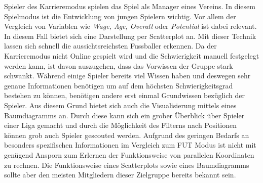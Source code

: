 \documentclass[usegeometry=true]{scrartcl}
\begin{document}
Spieler des Karrieremodus spielen das Spiel als Manager eines Vereins. In diesem Spielmodus ist die Entwicklung von jungen Spielern wichtig. Vor allem der Vergleich von Variablen wie \textit{Wage, Age, Overall} oder \textit{Potential} ist dabei relevant. In diesem Fall bietet sich eine Darstellung per Scatterplot an. Mit dieser Technik lassen sich schnell die aussichtsreichsten Fussballer erkennen. Da der Karrieremodus nicht Online gespielt wird und die Schwierigkeit manuell festgelegt werden kann, ist davon auszugehen, dass das Vorwissen der Gruppe stark schwankt. Während einige Spieler bereits viel Wissen haben und deswegen sehr genaue Informationen benötigen um auf dem höchsten Schwierigkeitsgrad bestehen zu können, benötigen andere erst einmal Grundwissen bezüglich der Spieler. Aus diesem Grund bietet sich auch die Visualisierung mittels eines Baumdiagramms an. Durch diese kann sich ein grober Überblick über Spieler einer Liga gemacht und durch die Möglichkeit des Filterns nach Positionen können grob auch Spieler gescouted werden. Aufgrund des geringen Bedarfs an besonders spezifischen Informationen im Vergleich zum FUT Modus ist nicht mit genügend Ansporn zum Erlernen der Funktionsweise von parallelen Koordinaten zu rechnen. Die Funktionsweise eines Scatterplots sowie eines Baumdiagramms sollte aber den meisten Mitgliedern dieser Zielgruppe bereits bekannt sein.
\end{document}
